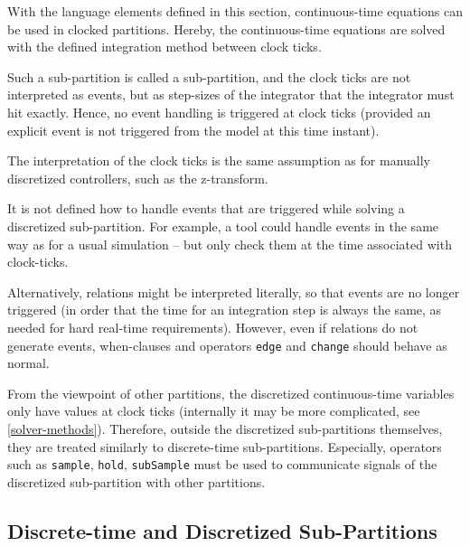 With the language elements defined in this section, continuous-time equations can be used in clocked partitions.
Hereby, the continuous-time equations are solved with the defined integration method between clock ticks.

Such a sub-partition is called a  sub-partition, and the clock ticks are not interpreted as events, but as step-sizes of the integrator that the integrator must hit exactly.
Hence, no event handling is triggered at clock ticks (provided an explicit event is not triggered from the model at this time instant).

\begin{nonnormative}
The interpretation of the clock ticks is the same assumption as for manually discretized controllers, such as the z-transform.
\end{nonnormative}

\begin{nonnormative}
It is not defined how to handle events that are triggered while solving a discretized sub-partition.
For example, a tool could handle events in the same way as for a usual simulation -- but only check them at the time associated with clock-ticks.

Alternatively, relations might be interpreted literally, so that events are no longer triggered (in order that the time for an integration step is always the same, as needed for hard real-time requirements).
However, even if relations do not generate events, when-clauses and operators \lstinline!edge! and \lstinline!change! should behave as normal.
\end{nonnormative}

From the viewpoint of other partitions, the discretized continuous-time variables only have values at clock ticks (internally it may be more complicated, see \cref{solver-methods}).
Therefore, outside the discretized sub-partitions themselves, they are treated similarly to discrete-time sub-partitions.
Especially, operators such as \lstinline!sample!, \lstinline!hold!, \lstinline!subSample! must be used to communicate signals of the discretized sub-partition with other partitions.

\subsection{Discrete-time and Discretized Sub-Partitions}\label{clocked-discrete-time-and-clocked-discretized-continuous-time-partition}\label{clocked-and-discretized-partition}

